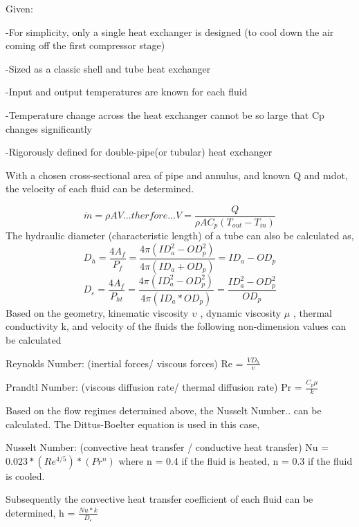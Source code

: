 \documentclass[heading.tex]{subfiles}
\begin{document}
Given:

-For simplicity, only a single heat exchanger is designed (to cool down the air coming off the first compressor stage)

-Sized as a classic shell and tube heat exchanger

-Input and output temperatures are known for each fluid

-Temperature change across the heat exchanger cannot be so large that Cp changes significantly

-Rigorously defined for double-pipe(or tubular) heat exchanger

With a chosen cross-sectional area of pipe and annulus, and known Q and mdot, the velocity of each fluid can be determined.

\begin{equation*}
\dot{m} = \rho A V     ...therfore...        V  = \frac{Q} {\rho A C_{p} (T_{out} - T_{in})}
\end{equation*}
The hydraulic diameter (characteristic length) of a tube can also be calculated as,
\begin{equation*}
D_{h} = \frac{4 A_{f}} {P_{f}}  = \frac{4 \pi (ID_{a}^2-OD_{p}^2)} {4 \pi (ID_{a}+OD_{p})} = ID_{a}-OD_{p}
\end{equation*}
\begin{equation*}
D_{\varepsilon} = \frac{4 A_{f}} {P_{ht}}   =  \frac{4 \pi (ID_{a}^2-OD_{p}^2)} {4 \pi (ID_{a}*OD_{p})} = \frac{ID_{a}^2-OD_{p}^2}{OD_{p}}
\end{equation*}
Based on the geometry, kinematic viscosity  $\upsilon$ , dynamic viscosity  $\mu$ , thermal conductivity k, and velocity of the fluids the following non-dimension values can be calculated

Reynolds Number: (inertial forces/ viscous forces)  Re = $\frac{V D_{h}} {\upsilon}$

Prandtl Number: (viscous diffusion rate/ thermal diffusion rate)  Pr = $\frac{C_{p} \mu} {k}$

Based on the flow regimes determined above, the Nusselt Number.. can be calculated. The Dittus-Boelter equation is used in this case,

Nusselt Number: (convective heat transfer / conductive heat transfer)  Nu = $0.023*(Re^{4/5})*(Pr^{n})$ where n = 0.4 if the fluid is heated, n = 0.3 if the fluid is cooled.

Subsequently the convective heat transfer coefficient of each fluid can be determined,  h = $\frac{Nu*k} {D_{\varepsilon}}$
\end{document}
